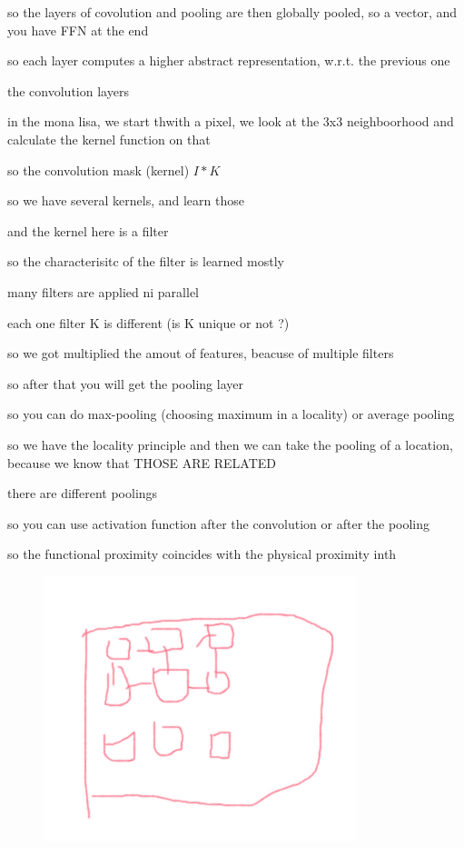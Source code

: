 \documentclass{article}
\begin{document}
so the layers of covolution and pooling are then globally pooled, so a vector, and you have FFN at the end

so each layer computes a higher abstract representation, w.r.t. the previous one

the convolution layers

in the mona lisa, we start thwith a pixel, we look at the 3x3 neighboorhood and calculate the kernel function on that

so the convolution mask (kernel)
$I * K$

so we have several kernels, and learn those

and the kernel here is a filter 

so the characterisitc of the filter is learned mostly

many filters are applied ni parallel

each one filter K is different (is K unique or not ?)

so we got multiplied the amout of features, beacuse of multiple filters

so after that you will get the pooling layer

so you can do max-pooling (choosing maximum in a locality) or average pooling

so we have the locality principle and then we can take the pooling of a location, because we know that THOSE ARE RELATED 

there are different poolings

so you can use activation function after the convolution or after the pooling


so the functional proximity coincides with the physical proximity inth

\begin{figure}
	\centering
	\includegraphics[width=0.7\linewidth]{"../imgs/cnn inductive bias"}
	\caption[Cnn inductive bias]{}
	\label{fig:cnn-inductive-bias}
\end{figure}
\end{document}
